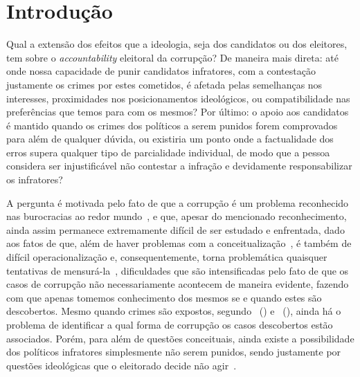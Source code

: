 \documentclass[
	12pt,				%
	openright,			%
	twoside,			%
	a4paper,			%
	openany,
	english,			%
	brazil				%
	]{abntex2}
\begin{document}
\tableofcontents*
\cleardoublepage

\textual



\chapter{Introdução}


Qual a extensão dos efeitos que a ideologia, seja dos candidatos ou dos eleitores, tem sobre o \textit{accountability} eleitoral da corrupção? De maneira mais direta: até onde nossa capacidade de punir candidatos infratores, com a contestação justamente os crimes por estes cometidos, é afetada pelas semelhanças nos interesses, proximidades nos posicionamentos ideológicos, ou compatibilidade nas preferências que temos para com os mesmos? Por último: o apoio aos candidatos é mantido quando os crimes dos políticos a serem punidos forem comprovados para além de qualquer dúvida, ou existiria um ponto onde a factualidade dos erros supera qualquer tipo de parcialidade individual, de modo que a pessoa considera ser injustificável não contestar a infração e devidamente responsabilizar os infratores?

A pergunta é motivada pelo fato de que a corrupção é um problema reconhecido nas burocracias ao redor mundo~\cite{Rose-Ackerman1996Sep, fukuyama2018corruption}, e que, apesar do mencionado reconhecimento, ainda assim permanece extremamente difícil de ser estudado e enfrentada, dado aos fatos de que, além de haver problemas com a conceitualização~\cite{bussell2015typologies}, é também de difícil operacionalização e, consequentemente, torna problemática quaisquer tentativas de mensurá-la~\cite{bussell2015typologies}, dificuldades que são intensificadas pelo fato de que os casos de corrupção não necessariamente acontecem de maneira evidente, fazendo com que apenas tomemos conhecimento dos mesmos se e quando estes são descobertos. Mesmo quando crimes são expostos, segundo ~(\citeyear{bussell2015typologies}) e ~(\citeyear{fukuyama2018corruption}), ainda há o problema de identificar a qual forma de corrupção os casos descobertos estão associados. Porém, para além de questões conceituais, ainda existe a possibilidade dos políticos infratores simplesmente não serem punidos, sendo justamente por questões ideológicas que o eleitorado decide não agir~\cite{barros2020voters}.
\end{document}

